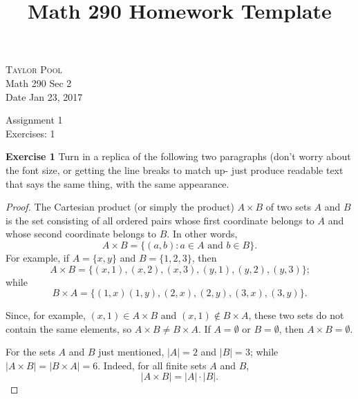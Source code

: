 \documentclass[12pt,oneside]{article}
\newenvironment{exercise}[1]{\vspace{.1in}\noindent\textbf{Exercise #1 \hspace{.05em}}}{}
\begin{document}
\title{Math 290 Homework Template}

\begin{flushright}
\textsc{Taylor Pool}  \\
Math 290 Sec 2\\
Date Jan 23, 2017
\end{flushright}

\begin{center}
\textsf{Assignment 1} \\
\textsf{Exercises: 1}
\end{center}


\begin{exercise}{1}
Turn in a replica of the following two paragraphs (don't worry about the font size, or getting the line breaks to match up- just produce readable text that says the same thing, with the same appearance.
\end{exercise}

\begin{proof}
The Cartesian product (or simply the product) $A\times B$ of two sets $A$ and $B$ is the set consisting of all ordered pairs whose first coordinate belongs to $A$ and whose second coordinate belongs to $B$. In other words, \[A \times B = \{(a,b):a \in A \text{ and } b \in B\}. \]
For example, if $A=\{x,y\}$ and $B=\{1,2,3\}$, then
\[A \times B = \{(x,1),(x,2),(x,3),(y,1),(y,2),(y,3)\} \text{;}\]
while
\[B \times A = \{(1,x)(1,y),(2,x),(2,y),(3,x),(3,y)\} \text{.}\]

Since, for example, $(x,1) \in A \times B$ and $(x,1) \notin B \times A$, these two sets do not contain the same elements, so $A \times B \neq B \times A$. If $A = \emptyset \text{ or } B = \emptyset$, then $A \times B = \emptyset$.

For the sets $A$ and $B$ just mentioned, $|A|=2$ and $|B|=3$; while $|A \times B|=|B \times A| = 6$. Indeed, for all finite sets $A$ and $B$,
\[|A \times B| = |A| \cdot |B| \text{.}\]
\end{proof}










\end{document}
